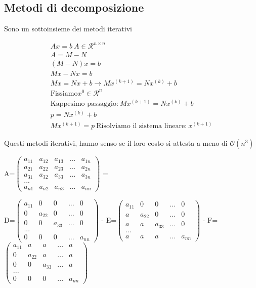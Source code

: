 \documentclass{article} %
\begin{document}
\begin{center}
    \newpage

    \subsection*{Metodi di decomposizione}
    Sono un sottoinsieme dei metodi iterativi


    \begin{align*}
        Ax=b\ A \in \mathcal{R}^{n\times n}\\
        A=M-N\\
        (M-N)x=b\\
        Mx-Nx=b\\
        Mx=Nx+b \rightarrow Mx^{(k+1)}=Nx^{(k)}+b\\
        \text{Fissiamo} x^{0} \in \mathcal{R}^n\\
        \text{Kappesimo passaggio:}\ Mx^{(k+1)}=Nx^{(k)}+b\\
        p=Nx^{(k)}+b\\
        Mx^{(k+1)}=p\ \text{Risolviamo il sistema lineare:}\ x^{(k+1)}
    \end{align*}

    Questi metodi iterativi, hanno senso se il loro costo si attesta a meno di \(\mathcal{O}(n^3)\)

    A=\(\begin{pmatrix}
        a_{11} & a_{12} & a_{13} & ... & a_{1n}\\
        a_{21} & a_{22} & a_{23} & ... & a_{2n}\\
        a_{31} & a_{32} & a_{33} & ... & a_{3n}\\
        ...\\
        a_{n1} & a_{n2} & a_{n3} & ... & a_{nn}
    \end{pmatrix}\)
    =

    D=\(\begin{pmatrix}
        a_{11} & 0 & 0 & ... & 0\\
        0 & a_{22} & 0 & ... & 0\\
        0 & 0 & a_{33} & ... & 0\\
        ...\\
        0 & 0 & 0 & ... & a_{nn}
    \end{pmatrix}\)
    -
    E=\(\begin{pmatrix}
        a_{11} & 0 & 0 & ... & 0\\
        a & a_{22} & 0 & ... & 0\\
        a & a & a_{33} & ... & 0\\
        ...\\
        a & a & a & ... & a_{nn}
    \end{pmatrix}\)
    - 
    F=\(\begin{pmatrix}
        a_{11} & a & a & ... & a\\
        0 & a_{22} & a & ... & a\\
        0 & 0 & a_{33} & ... & a\\
        ...\\
        0 & 0 & 0 & ... & a_{nn}
    \end{pmatrix}\)


\end{center}
\end{document}
